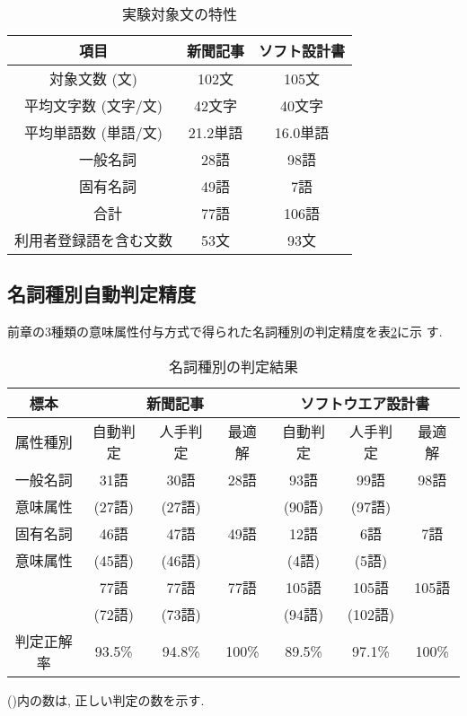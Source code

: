 \begin{table}[htbp]
  \caption{実験対象文の特性}
  \label{tab:3}
  \begin{center}
    \leavevmode
    \begin{tabular}{|c|c|c|c|}
      \hline
      \multicolumn{2}{|c|}{項目} & 新聞記事 & ソフト設計書 \\ \hline
      \multicolumn{2}{|c|}{対象文数 (文) }  & 102文 & 105文 \\ \hline
      \multicolumn{2}{|c|}{平均文字数 (文字/文) }  & 42文字 & 40文字 \\ \hline
      \multicolumn{2}{|c|}{平均単語数 (単語/文) }  & 21.2単語 & 16.0単語 \\ \hline
       \raisebox{-6pt}{利用者辞書} & 一般名詞 & 28語 & 98語 \\ \cline{2-4}
       \raisebox{-6pt}{登録語数} & 固有名詞 & 49語 & 7語 \\ \cline{2-4}
      & 合計 & 77語 & 106語 \\ \hline
      \multicolumn{2}{|c|}{利用者登録語を含む文数}  & 53文 & 93文 \\ \hline
    \end{tabular}
  \end{center}
\end{table}


\subsection{名詞種別自動判定精度}
\label{sec:4.2}

前章の3種類の意味属性付与方式で得られた名詞種別の判定精度を表\ref{tab:4}に示
す.  

\begin{table}[htbp]
  \caption{名詞種別の判定結果}
  \label{tab:4}
  \begin{center}
    \leavevmode
    \begin{tabular}{|c|c|c|c|c|c|c|}
      \hline
      標本 & \multicolumn{3}{|c|}{新聞記事} & \multicolumn{3}{|c|}{ソフトウエア設計書} \\\hline
      属性種別 & 自動判定 & 人手判定 & 最適解 & 自動判定 & 人手判定 & 最適解 \\\hline
      一般名詞 & 31語 & 30語 & 28語 & 93語 & 99語 & 98語 \\\cline{2-7}
      意味属性 & (27語) & (27語) & & (90語) & (97語) & \\\hline
      固有名詞 & 46語 & 47語 & 49語 & 12語 & 6語 & 7語 \\\cline{2-7}
      意味属性 & (45語) & (46語) & & (4語) & (5語) &  \\\hline
      \raisebox{-6pt}{合計} & 77語 & 77語 & 77語 & 105語 & 105語 & 105語 \\\cline{2-7}
      & (72語) & (73語) & & (94語) & (102語) & \\\hline
      判定正解率 & 93.5\% & 94.8\% & 100\% & 89.5\% & 97.1\% & 100\% \\\hline
    \end{tabular}

    \vspace{1.5mm} ()内の数は, 正しい判定の数を示す. 
  \end{center}
\end{table}


